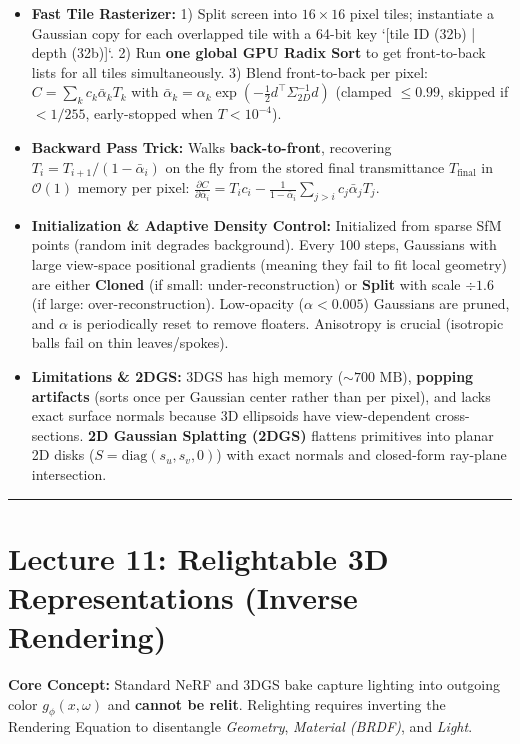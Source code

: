 \documentclass[10pt, a4paper]{article}
\newcommand{\hr}{\vspace{0.8em}\hrule\vspace{0.8em}}
\begin{document}
\begin{itemize}
\begin{itemize}
        $$\mu_{2D} = \pi(W\mu + t), \qquad \Sigma_{2D} = J W \Sigma W^\top J^\top \in \mathbb{R}^{2\times 2}$$
        \item \textbf{Fast Tile Rasterizer:}
        1) Split screen into $16\times 16$ pixel tiles; instantiate a Gaussian copy for each overlapped tile with a 64-bit key `[tile ID (32b) | depth (32b)]`.
        2) Run \textbf{one global GPU Radix Sort} to get front-to-back lists for all tiles simultaneously.
        3) Blend front-to-back per pixel: $C = \sum_k c_k \bar{\alpha}_k T_k$ with $\bar{\alpha}_k = \alpha_k \exp(-\frac{1}{2} d^\top \Sigma_{2D}^{-1} d)$ (clamped $\le 0.99$, skipped if $<1/255$, early-stopped when $T < 10^{-4}$).
        \item \textbf{Backward Pass Trick:} Walks \textbf{back-to-front}, recovering $T_i = T_{i+1} / (1 - \bar{\alpha}_i)$ on the fly from the stored final transmittance $T_{\text{final}}$ in $\mathcal{O}(1)$ memory per pixel: $\frac{\partial C}{\partial \bar{\alpha}_i} = T_i c_i - \frac{1}{1-\bar{\alpha}_i}\sum_{j>i} c_j \bar{\alpha}_j T_j$.
        \item \textbf{Initialization \& Adaptive Density Control:} Initialized from sparse SfM points (random init degrades background). Every 100 steps, Gaussians with large view-space positional gradients (meaning they fail to fit local geometry) are either \textbf{Cloned} (if small: under-reconstruction) or \textbf{Split} with scale $\div 1.6$ (if large: over-reconstruction). Low-opacity ($\alpha < 0.005$) Gaussians are pruned, and $\alpha$ is periodically reset to remove floaters. Anisotropy is crucial (isotropic balls fail on thin leaves/spokes).
        \item \textbf{Limitations \& 2DGS:} 3DGS has high memory ($\sim 700\text{ MB}$), \textbf{popping artifacts} (sorts once per Gaussian center rather than per pixel), and lacks exact surface normals because 3D ellipsoids have view-dependent cross-sections. \textbf{2D Gaussian Splatting (2DGS)} flattens primitives into planar 2D disks ($S = \text{diag}(s_u, s_v, 0)$) with exact normals and closed-form ray-plane intersection.
    \end{itemize}
\end{itemize}

\hr
\section*{\textcolor{primary}{Lecture 11: Relightable 3D Representations (Inverse Rendering)}}
\textbf{Core Concept:} Standard NeRF and 3DGS bake capture lighting into outgoing color $g_\phi(x,\omega)$ and \textbf{cannot be relit}. Relighting requires inverting the Rendering Equation to disentangle \emph{Geometry}, \emph{Material (BRDF)}, and \emph{Light}.
\end{document}

